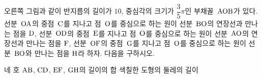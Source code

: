 \noindent\begin{minipage}[t]{0.58\linewidth}\vspace{0pt}\raggedright 오른쪽 그림과 같이 반지름의 길이가 $10$, 중심각의 크기가 $\dfrac{3}{5}\pi$인 부채꼴~$\mathrm{AOB}$가 있다. 선분~$\mathrm{OA}$의 중점~$\mathrm{C}$를 지나고 점~$\mathrm{O}$를 중심으로 하는 원이 선분~$\mathrm{BO}$의 연장선과 만나는 점을 $\mathrm{D}$, 선분~$\mathrm{OD}$의 중점~$\mathrm{E}$를 지나고 점~$\mathrm{O}$를 중심으로 하는 원이 선분~$\mathrm{AO}$의 연장선과 만나는 점을 $\mathrm{F}$, 선분~$\mathrm{OF}$의 중점~$\mathrm{G}$를 지나고 점~$\mathrm{O}$를 중심으로 하는 원이 선분~$\mathrm{BO}$와 만나는 점을 $\mathrm{H}$라 하자. 다음을 구하시오.\end{minipage}\hfill\begin{minipage}[t]{0.4\linewidth}\vspace{0pt}\centering \resizebox{\ifdim\width>\linewidth\linewidth\else\width\fi}{!}{}\end{minipage}\par
{} 네 호 $\mathrm{AB}$, $\mathrm{CD}$, $\mathrm{EF}$, $\mathrm{GH}$의 길이의 합
 색칠한 도형의 둘레의 길이
